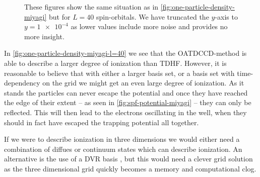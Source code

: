 \begin{figure}
            \caption{These figures show the same situation as in
            \autoref{fig:one-particle-density-miyagi} but for $L = 40$
            spin-orbitals.
            We have truncated the $y$-axis to $y = \num{1e-4}$ as lower
            values include more noise and provides no more insight.}
            \label{fig:one-particle-density-miyagi-l=40}
        \end{figure}
        In \autoref{fig:one-particle-density-miyagi-l=40} we see that the
        OATDCCD-method is able to describe a larger degree of ionization than
        TDHF.
        However, it is reasonable to believe that with either a larger basis
        set, or a basis set with time-dependency on the grid we might get an
        even large degree of ionization.
        As it stands the particles can never escape the potential and once they
        have reached the edge of their extent -- as seen in
        \autoref{fig:spf-potential-miyagi} -- they can only be reflected.
        This will then lead to the electrons oscillating in the well, when they
        should in fact have escaped the trapping potential all together.


        If we were to describe ionization in three dimensions we would either
        need a combination of diffues or continuum states which can describe
        ionization.
        An alternative is the use of a DVR basis \cite{miyagi_and_madsen,
        takeshi}, but this would need a clever grid solution as the three
        dimensional grid quickly becomes a memory and computational clog.



